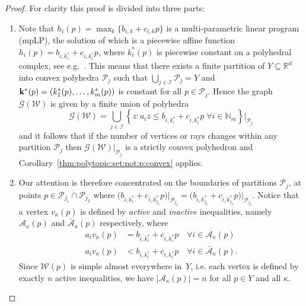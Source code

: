 \documentclass[smallextended]{svjour3}       %
\numberwithin{equation}{section}
\providecommand{\abs}[1]{\left|#1\right|}
\begin{document}
%
\begin{proof}
For clarity this proof is divided into three parts:
\begin{enumerate}
\item Note that $h_i(p) = \max_{k} \{b_{i,k} + c_{i,k}p\}$ is a multi-parametric linear program (mpLP),
the solution of which is a piecewise affine function $h_i(p) = b_{i,k^\ast_i} + c_{i,k^\ast_i}p$, where $k^\ast_i(p)$ is piecewise constant on a polyhedral complex, see e.g.~\cite{spjotvold:2005}.
%
This means that there exists a finite partition of $Y\subseteq\mathbb R^d$ into convex polyhedra 
$\mathcal P_j$ such that $\bigcup_{j\in\mathcal I} \mathcal P_j = Y$ and 
${\bf{k}}^\ast(p) = (k_1^\ast(p),\dots,k_m^\ast(p))$ is constant for all $p \in \mathcal P_j$.
%
Hence the graph $\mathscr G(\mathcal W)$ is given by a finite union of polyhedra
%
\begin{equation*}
  \mathscr G(\mathcal W) = \bigcup_{j\in\mathcal I} \left\{z: a_i z \leq b_{i,k_i^\ast} + c_{i,k_i^\ast}p \; \forall i \in\mathbb N_m \right\}\bigr\vert_{\mathcal P_{j}}
\end{equation*}
%
and it follows that if the number of vertices or rays changes within any partition $\mathcal P_j$ then $\mathscr
G(\mathcal W)\vert_{\mathcal P_j}$ is a strictly convex polyhedron and Corollary~\ref{thm:polytopic:set:not:p:convex} applies.
%
\item Our attention is therefore concentrated on the boundaries of partitions $\mathcal P_j$, at points $p\in\mathcal P_{j_1} \cap \mathcal P_{j_2}$ where 
$\bigl(b_{i,k_i^\ast} + c_{i,k_{j_1}^\ast} p\bigr)\bigr\rvert_{\mathcal P_{j_1}} = 
\bigl(b_{i,k_{j_2}^\ast} + c_{i,k_{j_2}^\ast} p\bigr)\bigr\rvert_{\mathcal P_{j_2}}$.
%
Notice that a vertex $v_\kappa(p)$ is defined by \emph{active} and \emph{inactive} inequalities, namely $\mathcal A_\kappa(p)$ and
$\bar{\mathcal A}_\kappa(p)$ respectively, where
%
\begin{equation*}\begin{split}
  a_i v_\kappa(p) &= b_{i,k_i^\ast} + c_{i,k_i^\ast} p \quad\forall i\in\mathcal A_\kappa(p)\\
  a_i v_\kappa(p) &< b_{i,k_i^\ast} + c_{i,k_i^\ast} p \quad\forall i\in\bar{\mathcal A}_\kappa(p) .
\end{split}\end{equation*}
%
Since $\mathcal W(p)$ is simple almost everywhere in~$Y$, i.e. each vertex is defined by exactly $n$ active inequalities, we have $\abs{\mathcal A_\kappa(p)}=n$ for all $p\in Y$ and all $\kappa$.

\end{enumerate}
\end{proof}
\end{document}
